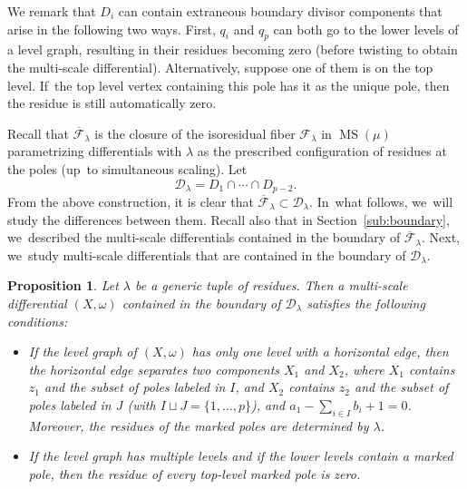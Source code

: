 \documentclass[JEP,XML,SOM,Unicode,NoFloatCountersInSection,published]{cedram}
\DeclareMathOperator\MS{MS}
\newtheorem{prop}[thm]{Proposition}
\theoremstyle{definition}
\begin{document}
We remark that $D_i$ can contain extraneous boundary divisor components that arise in the following two ways. First, $q_i$ and $q_p$ can both go to the lower levels of a level graph, resulting in their residues becoming zero (before twisting to obtain the multi-scale differential). Alternatively, suppose one of them is on the top level. If~the top level vertex containing this pole has it as the unique pole, then the residue is still automatically zero.

Recall that $\overline{\mathcal F}_{\lambda}$ is the closure of the isoresidual fiber $\mathcal F_\lambda$ in $\MS(\mu)$ parametrizing differentials with $\lambda$ as the prescribed configuration of residues at the poles (up~to simultaneous scaling). Let\vspace*{-3pt}
\[
\mathcal D_\lambda = D_1\cap \cdots \cap D_{p-2}.
\]
From the above construction, it is clear that
$\overline{\mathcal F}_\lambda\subset \mathcal D_\lambda$. In~what follows, we~will study the differences between them. Recall also that in Section~\ref{sub:boundary}, we~described the multi-scale differentials contained in the boundary of $\overline{\mathcal F}_{\lambda}$. Next, we~study multi-scale differentials that are contained in the boundary of $\mathcal D_\lambda$.

\begin{prop}
\label{prop:boundary}
Let $\lambda$ be a generic tuple of residues.
Then a multi-scale differential $(X,\omega)$ contained in the boundary of $\mathcal D_\lambda$ satisfies the following conditions:
\begin{itemize}
\item If the level graph of $(X,\omega)$ has only one level with a horizontal edge, then the horizontal edge separates two components $X_1$ and $X_2$, where $X_1$ contains $z_1$ and the subset of poles labeled in $I$, and $X_2$ contains $z_2$ and the subset of poles labeled in $J$ (with $I\sqcup J = \{1,\ldots,p\}$), and $a_1 - \sum_{i\in I} b_i + 1 = 0$. Moreover, the residues of the marked poles are determined by $\lambda$.
\item If the level graph has multiple levels and if the lower levels contain a marked pole, then the residue of every top-level marked pole is zero.
\end{itemize}
\end{prop}
\end{document}
